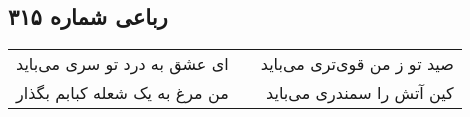 \begin{center}
\section*{رباعی شماره ۳۱۵}
\label{sec:sh315}
\begin{longtable}{l p{0.5cm} r}
ای عشق به درد تو سری می‌باید
&&
صید تو ز من قوی‌تری می‌باید
\\
من مرغ به یک شعله کبابم بگذار
&&
کین آتش را سمندری می‌باید
\\
\end{longtable}
\end{center}
